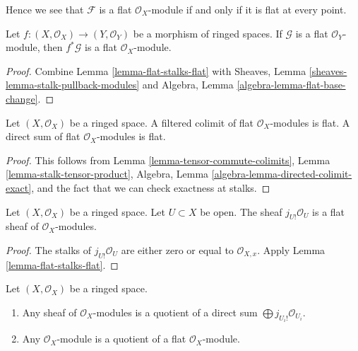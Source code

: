 \noindent
Hence we see that $\mathcal{F}$ is a flat $\mathcal{O}_X$-module
if and only if it is flat at every point.

\begin{lemma}
\label{lemma-base-change-flat}
Let $f : (X, \mathcal{O}_X) \to (Y, \mathcal{O}_Y)$
be a morphism of ringed spaces. If $\mathcal{G}$ is a flat
$\mathcal{O}_Y$-module, then $f^*\mathcal{G}$ is a flat
$\mathcal{O}_X$-module.
\end{lemma}

\begin{proof}
Combine Lemma \ref{lemma-flat-stalks-flat} with
Sheaves, Lemma \ref{sheaves-lemma-stalk-pullback-modules} and
Algebra, Lemma \ref{algebra-lemma-flat-base-change}.
\end{proof}

\begin{lemma}
\label{lemma-colimits-flat}
Let $(X, \mathcal{O}_X)$ be a ringed space.
A filtered colimit of flat $\mathcal{O}_X$-modules is flat.
A direct sum of flat $\mathcal{O}_X$-modules is flat.
\end{lemma}

\begin{proof}
This follows from
Lemma \ref{lemma-tensor-commute-colimits},
Lemma \ref{lemma-stalk-tensor-product},
Algebra, Lemma \ref{algebra-lemma-directed-colimit-exact},
and the fact that we can check exactness at stalks.
\end{proof}

\begin{lemma}
\label{lemma-j-shriek-flat}
Let $(X, \mathcal{O}_X)$ be a ringed space.
Let $U \subset X$ be open. The sheaf $j_{U!}\mathcal{O}_U$
is a flat sheaf of $\mathcal{O}_X$-modules.
\end{lemma}

\begin{proof}
The stalks of $j_{U!}\mathcal{O}_U$ are either zero or equal
to $\mathcal{O}_{X, x}$. Apply
Lemma \ref{lemma-flat-stalks-flat}.
\end{proof}

\begin{lemma}
\label{lemma-module-quotient-flat}
Let $(X, \mathcal{O}_X)$ be a ringed space.
\begin{enumerate}
\item Any sheaf of $\mathcal{O}_X$-modules is a quotient of
a direct sum $\bigoplus j_{U_i!}\mathcal{O}_{U_i}$.
\item Any $\mathcal{O}_X$-module is a quotient of
a flat $\mathcal{O}_X$-module.
\end{enumerate}
\end{lemma}

